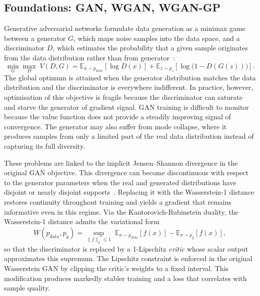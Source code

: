 \subsection{Foundations: GAN, WGAN, WGAN-GP}
\label{sec:bg:gan:foundations}

Generative adversarial networks formulate data generation as a
minimax game between a generator $G$, which maps noise samples into
the data space, and a discriminator $D$, which estimates the
probability that a given sample originates from the data distribution
rather than from generator~\cite{Goodfellow2014GAN}:
\begin{equation}
\label{eq:gan-minimax}
\min_{G} \max_{D}\; V(D, G) =
\mathbb{E}_{x \sim p_{\text{data}}}\!\left[\log D(x)\right]
+ \mathbb{E}_{z \sim p_z}\!\left[\log\bigl(1 - D(G(z))\bigr)\right].
\end{equation}
The global optimum is attained when the generator distribution
matches the data distribution and the discriminator is everywhere
indifferent. In practice, however, optimisation of this objective is
fragile because the discriminator can saturate and starve the generator of
gradient signal. GAN training is difficult to monitor because the value 
function does not provide
a steadily improving signal of convergence. The generator may also suffer from
mode collapse, where it produces samples from only a limited part of the real
data distribution instead of capturing its full diversity.

These problems are linked to the implicit Jensen--Shannon divergence in
the original GAN objective. This divergence can become discontinuous with
respect to the generator parameters when the real and generated
distributions have disjoint or nearly disjoint
supports~\cite{Arjovsky2017WGAN}. Replacing it with the Wasserstein-1
distance restores continuity throughout training and yields a
gradient that remains informative even in this regime. Via the
Kantorovich-Rubinstein duality, the Wasserstein-1 distance admits
the variational form
\begin{equation}
\label{eq:wasserstein-dual}
W(p_{\text{data}}, p_g)
= \sup_{\|f\|_{L} \leq 1}\;
\mathbb{E}_{x \sim p_{\text{data}}}\!\left[f(x)\right]
- \mathbb{E}_{x \sim p_g}\!\left[f(x)\right],
\end{equation}
so that the discriminator is replaced by a 1-Lipschitz \emph{critic}
whose scalar output approximates this supremum. The Lipschitz
constraint is enforced in the original Wasserstein GAN by clipping
the critic's weights to a fixed interval. This modification
produces markedly stabler training and a loss that correlates with
sample quality.

